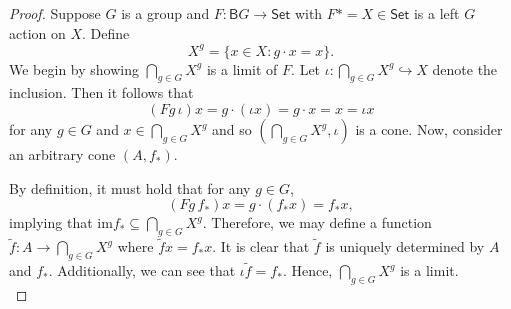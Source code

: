 \documentclass[ 12pt ]{article}
\begin{document}
\begin{enumerate}
		\begin{proof}
			Suppose $G$ is a group and $F : \mathsf{B}G \to \mathsf{Set}$ with $F \ast = X \in \mathsf{Set}$ is a left $G$ action on $X$. Define $$X^g = \{ x \in X : g \cdot x = x \}.$$ We begin by showing $\bigcap_{g \in G} X^g$ is a limit of $F$. Let $\iota : \bigcap_{g \in G} X^g \hookrightarrow X$ denote the inclusion. Then it follows that $$(Fg\, \iota) x = g \cdot (\iota x) = g \cdot x = x = \iota x$$ for any $g \in G$ and $x \in \bigcap_{g \in G} X^g$ and so $\left ( \bigcap_{g \in G} X^g, \iota \right )$ is a cone. Now, consider an arbitrary cone $(A, f_\ast)$.
			\begin{center}
			\end{center}
			By definition, it must hold that for any $g \in G$, $$(Fg\, f_\ast) x = g \cdot (f_\ast x) = f_\ast x,$$ implying that $\mathrm{im} f_\ast \subseteq \bigcap_{g \in G} X^g$. Therefore, we may define a function $\widetilde{f} : A \to \bigcap_{g \in G} X^g$ where $\widetilde{f} x = f_\ast x$. It is clear that $\widetilde{f}$ is uniquely determined by $A$ and $f_\ast$. Additionally, we can see that $\iota \widetilde{f} = f_\ast$. Hence, $\bigcap_{g \in G} X^g$ is a limit. \\


\end{proof}
\end{enumerate}
\end{document}

